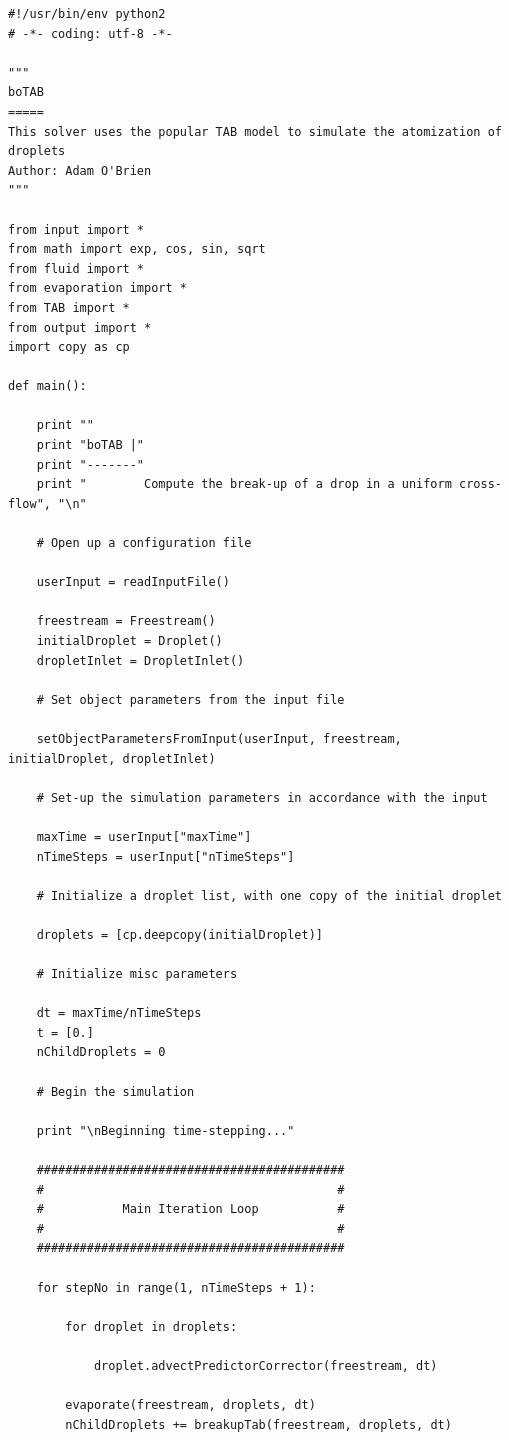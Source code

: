 \documentclass[12pt]{article}
\begin{document}
\begin{lstlisting}
#!/usr/bin/env python2
# -*- coding: utf-8 -*-

"""
boTAB
=====
This solver uses the popular TAB model to simulate the atomization of droplets
Author: Adam O'Brien
"""

from input import *
from math import exp, cos, sin, sqrt
from fluid import *
from evaporation import *
from TAB import *
from output import *
import copy as cp

def main():

    print ""
    print "boTAB |"
    print "-------"
    print "        Compute the break-up of a drop in a uniform cross-flow", "\n"

    # Open up a configuration file

    userInput = readInputFile()

    freestream = Freestream()
    initialDroplet = Droplet()
    dropletInlet = DropletInlet()

    # Set object parameters from the input file

    setObjectParametersFromInput(userInput, freestream, initialDroplet, dropletInlet)

    # Set-up the simulation parameters in accordance with the input

    maxTime = userInput["maxTime"]
    nTimeSteps = userInput["nTimeSteps"]

    # Initialize a droplet list, with one copy of the initial droplet

    droplets = [cp.deepcopy(initialDroplet)]

    # Initialize misc parameters

    dt = maxTime/nTimeSteps
    t = [0.]
    nChildDroplets = 0

    # Begin the simulation

    print "\nBeginning time-stepping..."

    ###########################################
    #                                         #
    #           Main Iteration Loop           #
    #                                         #
    ###########################################

    for stepNo in range(1, nTimeSteps + 1):

        for droplet in droplets:

            droplet.advectPredictorCorrector(freestream, dt)

        evaporate(freestream, droplets, dt)
        nChildDroplets += breakupTab(freestream, droplets, dt)


\end{lstlisting}
\end{document}
